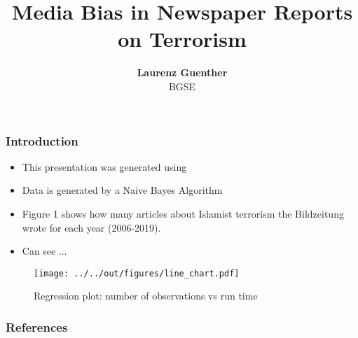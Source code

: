 \documentclass[11pt]{beamer}
\begin{document}
	
	\title{Media Bias in Newspaper Reports on Terrorism}
	
	\author[Laurenz Guenther]
	{
		{\bf Laurenz Guenther}\\
		{\small BGSE}\\[1ex]
	}
	
	
	\begin{frame}
	\titlepage
	\note{~}
\end{frame}


\begin{frame}[t]
\frametitle{Introduction}
\begin{itemize}
	\item<+-> This presentation was generated using \citet{GaudeckerEconProjectTemplates}
	\item<+-> Data is generated by a Naive Bayes Algorithm
	\item Figure 1 shows how many articles about Islamist terrorism the Bildzeitung wrote for each year (2006-2019).
	\item Can see ...
\end{itemize}
\note{~}
\end{frame}



\begin{frame}
	\begin{figure}
		\caption{Regression plot: number of observations vs run time}		
		\texttt{[image: ../../out/figures/line\_chart.pdf]}	
	\end{figure}
\end{frame}




 {
\begin{frame}
\frametitle{}
\end{frame}

}

\begin{frame}[allowframebreaks]
\frametitle{References}

\renewcommand{\bibfont}{\normalfont\footnotesize}
\printbibliography


\end{frame}
\end{document}
